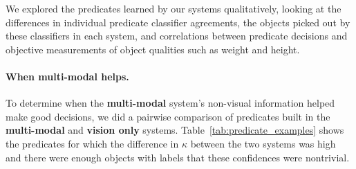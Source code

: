 We explored the predicates learned by our systems qualitatively, looking at the differences in individual predicate classifier agreements, the objects picked out by these classifiers in each system, and correlations between predicate decisions and objective measurements of object qualities such as weight and height.

\paragraph{When multi-modal helps.}
To determine when the \textbf{multi-modal} system's non-visual information helped make good decisions, we did a pairwise comparison of predicates built in the \textbf{multi-modal} and \textbf{vision only} systems.
Table~\ref{tab:predicate_examples} shows the predicates for which the difference in $\kappa$ between the two systems was high and there were enough objects with labels that these confidences were nontrivial.


